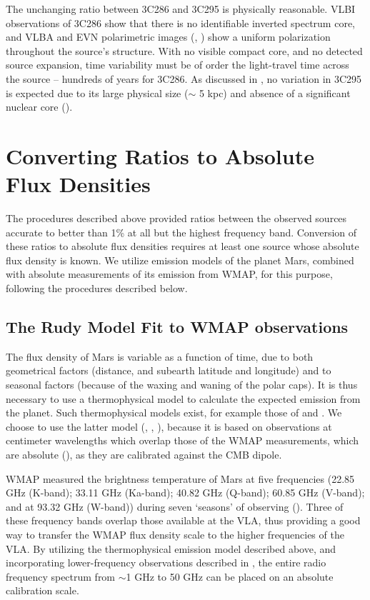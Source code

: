\documentclass{aastex}
\begin{document}
The unchanging ratio between 3C286 and 3C295 is physically reasonable.
VLBI observations of 3C286 show that there is no identifiable inverted
spectrum core, and VLBA and EVN polarimetric images (\citet{Cot97b},
\citet{Jia96}) show a uniform polarization throughout the source's
structure.  With no visible compact core, and no detected source
expansion, time variability must be of order the light-travel time
across the source -- hundreds of years for 3C286.  As discussed in
\citet{Ott94}, no variation in 3C295 is expected due to its large
physical size ($\sim$ 5 kpc) and absence of a significant nuclear core
(\citet{Tay92}).  

\section{Converting Ratios to Absolute Flux Densities}

The procedures described above provided ratios between the observed
sources accurate to better than 1\% at all but the highest frequency
band.  Conversion of these ratios to absolute flux densities requires
at least one source whose absolute flux density is known.  We utilize
emission models of the planet Mars, combined with absolute
measurements of its emission from WMAP, for this purpose, following
the procedures described below.

\subsection{The Rudy Model Fit to WMAP observations}

The flux density of Mars is variable as a function of time, due to
both geometrical factors (distance, and subearth latitude and
longitude) and to seasonal factors (because of the waxing and waning
of the polar caps).  It is thus necessary to use a thermophysical
model to calculate the expected emission from the planet.  Such
thermophysical models exist, for example those of \citet{Wri76} and
\citet{Rud87}. We choose to use the latter model (\citet{Rud87},
\citet{Muh91}, \citet{Sid00}), because it is based on observations at
centimeter wavelengths which overlap those of the WMAP measurements,
which are absolute (\citet{Wei11}), as they are calibrated
against the CMB dipole.

WMAP measured the brightness temperature of Mars at five frequencies
(22.85 GHz (K-band); 33.11 GHz (Ka-band); 40.82 GHz (Q-band); 60.85
GHz (V-band); and at 93.32 GHz (W-band)) during seven `seasons' of
observing (\citet{Wei11}).  Three of these frequency bands overlap
those available at the VLA, thus providing a good way to transfer the
WMAP flux density scale to the higher frequencies of the VLA.  By
utilizing the thermophysical emission model described above, and
incorporating lower-frequency observations described in \citet{Baa77},
the entire radio frequency spectrum from $\sim$1 GHz to 50 GHz can be
placed on an absolute calibration scale.
\end{document}
